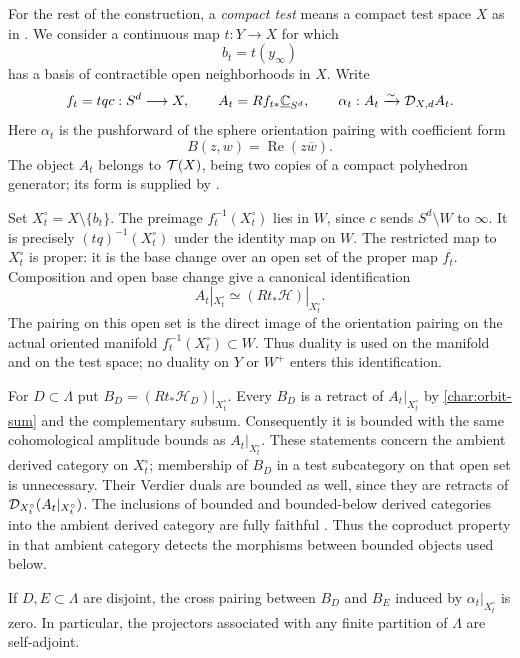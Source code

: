 For the rest of the construction, a \emph{compact test} means a compact
test space $X$ as in .  We consider a continuous
map $t:Y\to X$ for which
\[
 b_t=t(y_\infty)
\]
has a basis of contractible open neighborhoods in $X$.  Write
\begin{equation}\label{char:test-form}
 f_t=tqc:S^d\longrightarrow X,\qquad
 A_t=Rf_{t*}\underline{\mathbb C}_{S^d},\qquad
 \alpha_t:A_t\xrightarrow{\sim}\mathcal D_{X,d}A_t.
\end{equation}
Here $\alpha_t$ is the pushforward of the sphere orientation pairing
with coefficient form
\[
 B(z,w)=\operatorname{Re}(z\overline w).
\]
The object $A_t$ belongs to $\mathcal T(X)$, being two copies of a compact
polyhedron generator; its form is supplied by
.

Set $X_t^\circ=X\setminus\{b_t\}$.  The preimage
$f_t^{-1}(X_t^\circ)$ lies in $W$, since $c$ sends $S^d\setminus W$ to
$\infty$.  It is precisely $(tq)^{-1}(X_t^\circ)$ under the identity
map on $W$.  The restricted map to $X_t^\circ$ is proper: it is the
base change over an open set of the proper map $f_t$.  Composition and
open base change give a canonical identification
\begin{equation}\label{char:open-identification}
 A_t|_{X_t^\circ}\simeq(Rt_*\mathcal H)|_{X_t^\circ}.
\end{equation}
The pairing on this open set is the direct image of the orientation
pairing on the actual oriented manifold $f_t^{-1}(X_t^\circ)\subset W$.
Thus duality is used on the manifold and on the test space; no duality
on $Y$ or $W^+$ enters this identification.

For $D\subset\Lambda$ put
$B_D=(Rt_*\mathcal H_D)|_{X_t^\circ}$.  Every $B_D$ is a retract of
$A_t|_{X_t^\circ}$ by \eqref{char:orbit-sum} and the complementary
subsum.  Consequently it is bounded with the same cohomological
amplitude bounds as $A_t|_{X_t^\circ}$.  These statements concern the
ambient derived category on $X_t^\circ$; membership of $B_D$ in a test
subcategory on that open set is unnecessary. Their Verdier duals are
bounded as well, since they are retracts of \(\mathcal D_{X_t^\circ}(A_t|_{X_t^\circ})\).
The inclusions of bounded and bounded-below derived categories into the
ambient derived category are fully faithful
\cite[Definition~13.11.3 and Lemma~13.11.6]{StacksDerivedCategories}.
Thus the coproduct property in that ambient category detects the
morphisms between bounded objects used below.

\begin{lemma}\label{lem:orthogonality}
If $D,E\subset\Lambda$ are disjoint, the cross pairing between $B_D$
and $B_E$ induced by $\alpha_t|_{X_t^\circ}$ is zero.  In particular,
the projectors associated with any finite partition of $\Lambda$ are
self-adjoint.
\end{lemma}

